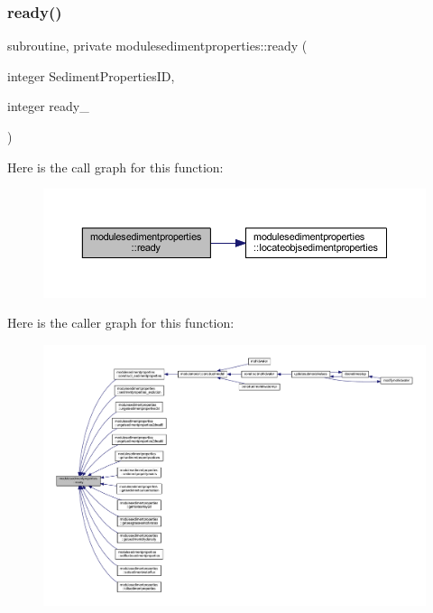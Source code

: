 \subsubsection{\texorpdfstring{ready()}{ready()}}
{\footnotesize\ttfamily subroutine, private modulesedimentproperties\+::ready (\begin{DoxyParamCaption}\item[{integer}]{Sediment\+Properties\+ID,  }\item[{integer}]{ready\+\_\+ }\end{DoxyParamCaption})\hspace{0.3cm}{\ttfamily [private]}}

Here is the call graph for this function\+:\nopagebreak
\begin{figure}[H]
\begin{center}
\leavevmode
\includegraphics[width=350pt]{namespacemodulesedimentproperties_a0ac80b6b6970285688cd69f623317e33_cgraph}
\end{center}
\end{figure}
Here is the caller graph for this function\+:\nopagebreak
\begin{figure}[H]
\begin{center}
\leavevmode
\includegraphics[width=350pt]{namespacemodulesedimentproperties_a0ac80b6b6970285688cd69f623317e33_icgraph}
\end{center}
\end{figure}
\mbox{\label{namespacemodulesedimentproperties_ac9dd7bcf2f966e31f868dc3dc7a2cc13}} 
